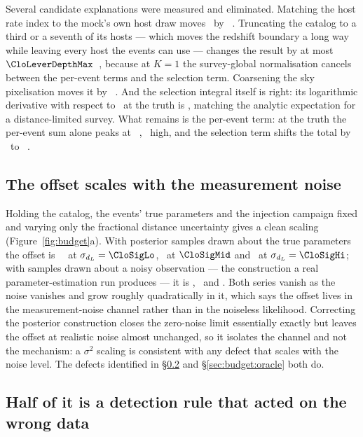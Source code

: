Several candidate explanations were measured and eliminated. Matching the host
rate index to the mock's own host draw moves \Hz\ by \CloLeverGamma~\kmsmpc.
Truncating the catalog to a third or a seventh of its hosts --- which moves the
redshift boundary a long way while leaving every host the events can use ---
changes the result by at most $\CloLeverDepthMax$~\kmsmpc, because at $K=1$ the
survey-global normalisation cancels between the per-event terms and the selection
term. Coarsening the sky pixelisation moves it by \CloLeverNside~\kmsmpc. And
the selection integral itself is right: its logarithmic derivative with respect
to \Hz\ at the truth is \CloDecompDlnmu, matching the analytic expectation for a
distance-limited survey. What remains is the per-event term: at the truth the
per-event sum alone peaks at \CloDecompNum~\kmsmpc, \CloDecompNumOff\ high, and
the selection term shifts the total by \CloDecompShift\ to
\CloDecompTotal~\kmsmpc.

\subsection{The offset scales with the measurement noise}
\label{sec:budget:noise}

Holding the catalog, the events' true parameters and the injection campaign fixed
and varying only the fractional distance uncertainty gives a clean scaling
(Figure~\ref{fig:budget}a). With posterior samples drawn about the true
parameters the offset is \CloTruthSigOneOff~\kmsmpc\ at
$\sigma_{d_L} = \CloSigLo$, \CloTruthSigThreeOff\ at $\CloSigMid$ and
\CloTruthSigTenOff\ at $\sigma_{d_L} = \CloSigHi$; with samples drawn about a
noisy observation --- the construction a real parameter-estimation run produces
--- it is \CloCorrSigOneOff, \CloCorrSigThreeOff\ and \CloCorrSigTenOff. Both
series vanish as the noise vanishes and grow roughly quadratically in it, which
says the offset lives in the measurement-noise channel rather than in the
noiseless likelihood. Correcting the posterior construction closes the
zero-noise limit essentially exactly but leaves the offset at realistic noise
almost unchanged, so it isolates the channel and not the mechanism: a $\sigma^2$
scaling is consistent with any defect that scales with the noise level. The
defects identified in \S\ref{sec:budget:detection} and
\S\ref{sec:budget:oracle} both do.

\subsection{Half of it is a detection rule that acted on the wrong data}
\label{sec:budget:detection}

